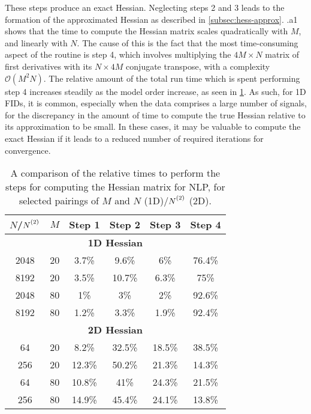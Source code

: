 These steps produce an exact Hessian. Neglecting steps 2 and 3 leads to the
formation of the approximated Hessian as described in
\cref{subsec:hess-approx}. .a1 shows that the
time to compute the Hessian matrix scales quadratically with $M$, and
linearly with $N$. The cause of this is the fact that the most time-consuming
aspect of the routine is step 4, which involves multiplying the $4M \times N$
matrix of first derivatives with its  $N \times 4M$ conjugate transpose, with a
complexity $\mathcal{O}(M^2N)$. The relative amount of the total run time which
is spent performing step 4 increases steadily as the model order increase, as
seen in \cref{tab:hess-steps}.
As such, for \ac{1D} \acp{FID}, it is
common, especially when the data comprises a large number of
signals, for the discrepancy in the amount of time to compute the true
Hessian relative to its approximation to be small. In these cases, it may be
valuable to compute the exact Hessian if it leads to a reduced number of
required iterations for convergence.
\begin{table}
    \begin{center}
        \begin{tabular}{ c c c c c c }
            \toprule
            $N$/$\Ntwo$ &
            $M$ &
            Step 1 &
            Step 2 &
            Step 3 &
            Step 4 \\
            \midrule
            \multicolumn{6}{c}{\textbf{1D Hessian}}\\
            \midrule
            2048 & 20 & 3.7\% & 9.6\% & 6\% & 76.4\% \\
            8192 & 20 & 3.5\% & 10.7\% & 6.3\% & 75\% \\
            2048 & 80 & 1\% & 3\% & 2\% & 92.6\% \\
            8192 & 80 & 1.2\% & 3.3\% & 1.9\% & 92.4\% \\
            \midrule
            \multicolumn{6}{c}{\textbf{2D Hessian}}\\
            \midrule
            64 & 20 & 8.2\% & 32.5\% & 18.5\% & 38.5\% \\
            256 & 20 & 12.3\% & 50.2\% & 21.3\% & 14.3\% \\
            64 & 80 & 10.8\% & 41\% & 24.3\% & 21.5\% \\
            256 & 80 & 14.9\% & 45.4\% & 24.1\% & 13.8\% \\
            \bottomrule
        \end{tabular}
    \end{center}
    \caption[
        A comparison of the relative times to perform the steps for
        computing the Hessian matrix for \acs{NLP}.
    ]{
        A comparison of the relative times to perform the steps for
        computing the Hessian matrix for \acs{NLP}, for selected pairings of
        $M$ and $N$ (\ac{1D})/$\Ntwo$ (\ac{2D}).
    }
    \label{tab:hess-steps}
\end{table}

